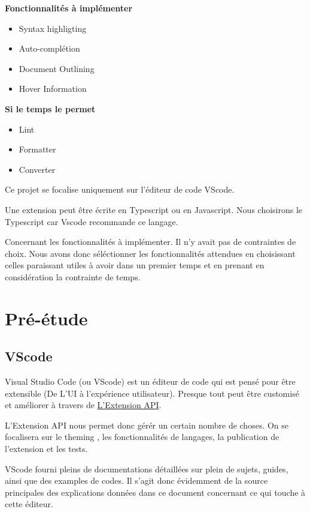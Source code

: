 \documentclass[
    iict, %
    il, %
]{heig-tb}
\begin{document}
\textbf{Fonctionnalités à implémenter}
\begin{itemize}
    \item Syntax highligting
    \item Auto-complétion
    \item Document Outlining
    \item Hover Information
\end{itemize}

\textbf{Si le temps le permet}
\begin{itemize}
    \item Lint
    \item Formatter
    \item Converter
\end{itemize}

\vspace{\parskip}

Ce projet se focalise uniquement sur l'éditeur de code VScode.

Une extension peut être écrite en Typescript ou en Javascript.
Nous choisirons le Typescript car Vscode recommande ce langage.

Concernant les fonctionnalités à implémenter. Il n'y avait pas de contraintes de choix.
Nous avons donc séléctionner les fonctionnalités attendues en choisissant celles paraissant utiles à avoir dans un premier temps et en prenant en considération la contrainte de temps.

\chapter{Pré-étude}

\section{VScode}
Visual Studio Code (ou VScode) est un éditeur de code qui est pensé pour être extensible (De L'UI à l'expérience utilisateur).
Presque tout peut être customisé et améliorer à travers de \href{https://code.visualstudio.com/api/extension-capabilities/overview}{L'Extension API}.

L'Extension API nous permet donc gérér un certain nombre de choses.
On se focalisera sur le theming , les fonctionnalités de langages, la publication de l'extension et les tests.

VScode fourni pleins de documentations détaillées sur plein de sujets, guides, ainsi que des examples de codes.
Il s'agit donc évidemment de la source principales des explications données dans ce document concernant ce qui touche à cette éditeur.
\end{document}
